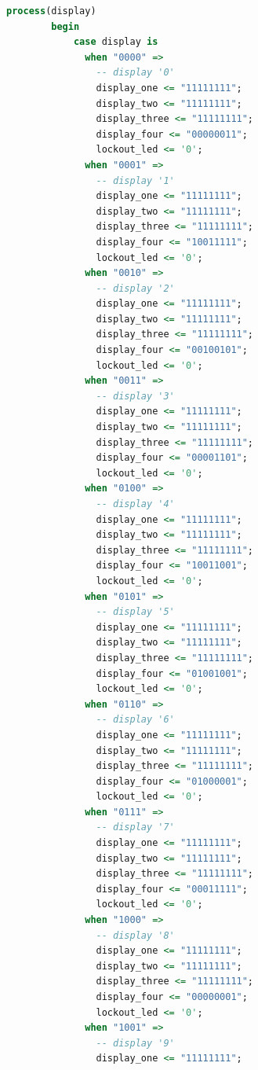 \documentclass[11pt]{article}
\begin{document}
\begin{appendices}
\begin{lstlisting}[language=VHDL]
    process(display)
        begin
            case display is
              when "0000" =>
                -- display '0'
                display_one <= "11111111";
                display_two <= "11111111";
                display_three <= "11111111";
                display_four <= "00000011";
                lockout_led <= '0';
              when "0001" =>
                -- display '1'
                display_one <= "11111111";
                display_two <= "11111111";
                display_three <= "11111111";
                display_four <= "10011111";
                lockout_led <= '0';
              when "0010" =>
                -- display '2'
                display_one <= "11111111";
                display_two <= "11111111";
                display_three <= "11111111";
                display_four <= "00100101";
                lockout_led <= '0';
              when "0011" =>
                -- display '3'
                display_one <= "11111111";
                display_two <= "11111111";
                display_three <= "11111111";
                display_four <= "00001101";
                lockout_led <= '0';
              when "0100" =>
                -- display '4'
                display_one <= "11111111";
                display_two <= "11111111";
                display_three <= "11111111";
                display_four <= "10011001";
                lockout_led <= '0';
              when "0101" =>
                -- display '5'
                display_one <= "11111111";
                display_two <= "11111111";
                display_three <= "11111111";
                display_four <= "01001001";
                lockout_led <= '0';
              when "0110" =>
                -- display '6'
                display_one <= "11111111";
                display_two <= "11111111";
                display_three <= "11111111";
                display_four <= "01000001";
                lockout_led <= '0';
              when "0111" =>
                -- display '7'
                display_one <= "11111111";
                display_two <= "11111111";
                display_three <= "11111111";
                display_four <= "00011111";
                lockout_led <= '0';
              when "1000" =>
                -- display '8'
                display_one <= "11111111";
                display_two <= "11111111";
                display_three <= "11111111";
                display_four <= "00000001";
                lockout_led <= '0';
              when "1001" =>
                -- display '9'
                display_one <= "11111111";

\end{lstlisting}
\end{appendices}
\end{document}
